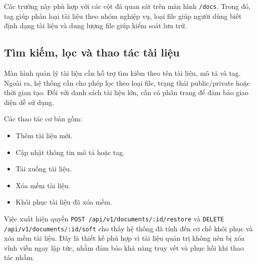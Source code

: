 Các trường này phù hợp với các cột đã quan sát trên màn hình \texttt{/docs}. Trong đó, tag giúp phân loại tài liệu theo nhóm nghiệp vụ, loại file giúp người dùng biết định dạng tài liệu và dung lượng file giúp kiểm soát lưu trữ.

\subsection{Tìm kiếm, lọc và thao tác tài liệu}

Màn hình quản lý tài liệu cần hỗ trợ tìm kiếm theo tên tài liệu, mô tả và tag. Ngoài ra, hệ thống cần cho phép lọc theo loại file, trạng thái public/private hoặc thời gian tạo. Đối với danh sách tài liệu lớn, cần có phân trang để đảm bảo giao diện dễ sử dụng.

Các thao tác cơ bản gồm:

\begin{itemize}
    \item Thêm tài liệu mới.
    \item Cập nhật thông tin mô tả hoặc tag.
    \item Tải xuống tài liệu.
    \item Xóa mềm tài liệu.
    \item Khôi phục tài liệu đã xóa mềm.
\end{itemize}

Việc xuất hiện quyền \texttt{POST /api/v1/documents/:id/restore} và \texttt{DELETE /api/v1/documents/:id/soft} cho thấy hệ thống đã tính đến cơ chế khôi phục và xóa mềm tài liệu. Đây là thiết kế phù hợp vì tài liệu quản trị không nên bị xóa vĩnh viễn ngay lập tức, nhằm đảm bảo khả năng truy vết và phục hồi khi thao tác nhầm.
